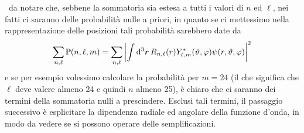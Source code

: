 \begin{soluzione}
   \E\ da notare che, sebbene la sommatoria sia estesa a tutti i valori di $n$ ed $\ell$, nei fatti ci saranno delle probabilità nulle a priori, in quanto se ci mettessimo nella rappresentazione delle posizioni tali probabilità sarebbero date da
   \begin{equation*}
      \sum_{n,\ell} \mathbb{P}(n,\ell,m)
      =\sum_{n,\ell} \qty| \int \dd[3]{\vb*{r}} R_{n,\ell}(r) Y_{\ell,m}^*(\vartheta,\varphi) \psi(r,\vartheta,\varphi) |^2
   \end{equation*}
   e se per esempio volessimo calcolare la probabilità per $m=24$ (il che significa che $\ell$ deve valere almeno 24 e quindi $n$ almeno 25), è chiaro che ci saranno dei termini della sommatoria nulli a prescindere. Esclusi tali termini, il passaggio successivo è esplicitare la dipendenza radiale ed angolare della funzione d'onda, in modo da vedere se si possono operare delle semplificazioni.


\end{soluzione}

